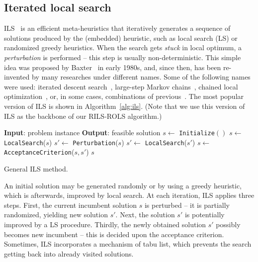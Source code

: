 \documentclass[a4paper,12pt]{elsarticle}
\begin{document}
	\subsection{Iterated local search}
	ILS~\cite{lourencco2003iterated} is an efficient meta-heuristics that iteratively generates a sequence of solutions produced by the (embedded) heuristic, such as local search (LS) or randomized greedy heuristics. When the search gets \emph{stuck} in local optimum, a \emph{perturbation} is performed -- this step is usually non-deterministic. This simple idea was proposed by Baxter~\cite{baxter1981local} in early 1980s, and, since then, has been  re-invented by many researches under different names. Some of the following names were used: iterated descent search~\cite{baum1998iterated}, large-step
	Markov chains~\cite{martin1991large}, chained local optimization~\cite{martin1996combining}, or, in some cases, combinations of previous~\cite{applegate2003chained}. The most popular version of ILS is shown in Algorithm~\ref{alg:ils}. (Note that we use this version of ILS as the backbone of our \textsc{RILS}-\textsc{ROLS} algorithm.)
	
	\begin{algorithm}
		\begin{algorithmic}[1] 
			\State \textbf{Input}: problem instance
			\State \textbf{Output}: feasible solution 
			\State $s \gets$ \texttt{Initialize}$()$
			\State  $s \gets$ \texttt{LocalSearch}($s$)
			\State  $s' \gets$ \texttt{Perturbation}($s$)
			\State  $s' \gets$ \texttt{LocalSearch}($s'$)
			\State  $ s \gets$ \texttt{AcceptanceCriterion}($s, s'$)
			\EndWhile
			\State \Return $s$
		\end{algorithmic}
		\caption{General ILS method.}
		\label{alg:ils}
	\end{algorithm}  
	
	An initial solution may be generated randomly or by using a greedy heuristic, which is afterwards, improved by local search. At each iteration, ILS applies three steps. First, the current incumbent solution $s$ is perturbed -- it is partially randomized, yielding new solution $s'$. Next, the solution $s'$ is potentially improved by a LS procedure. Thirdly, the newly obtained solution $s'$  possibly becomes new incumbent -- this is decided upon the acceptance criterion. Sometimes, ILS incorporates a mechanism of tabu list, which prevents the search getting back into already visited solutions.  		 
	
\end{document}
